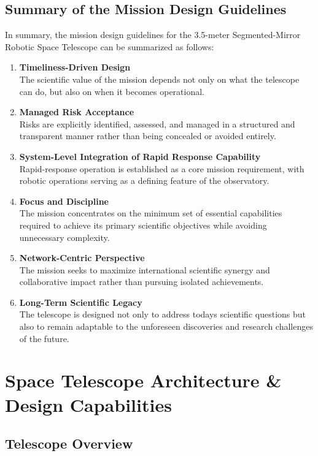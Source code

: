 \section{Summary of the Mission Design Guidelines}

In summary, the mission design guidelines for the 3.5-meter Segmented-Mirror Robotic Space Telescope can be summarized as follows:

\begin{enumerate}
\def\labelenumi{\arabic{enumi}.}
\item
  \textbf{Timeliness-Driven Design}\\
  The scientific value of the mission depends not only on what the telescope can do, but also on when it becomes operational.
\item
  \textbf{Managed Risk Acceptance}\\
  Risks are explicitly identified, assessed, and managed in a structured and transparent manner rather than being concealed or avoided entirely.
\item
  \textbf{System-Level Integration of Rapid Response Capability}\\
  Rapid-response operation is established as a core mission requirement, with robotic operations serving as a defining feature of the observatory.
\item
  \textbf{Focus and Discipline}\\
  The mission concentrates on the minimum set of essential capabilities required to achieve its primary scientific objectives while avoiding unnecessary complexity.
\item
  \textbf{Network-Centric Perspective}\\
  The mission seeks to maximize international scientific synergy and collaborative impact rather than pursuing isolated achievements.
\item
  \textbf{Long-Term Scientific Legacy}\\
  The telescope is designed not only to address today\textquotesingle s scientific questions but also to remain adaptable to the unforeseen discoveries and research challenges of the future.
\end{enumerate}

\chapter{Space Telescope Architecture \& Design Capabilities}


\section{Telescope Overview}

